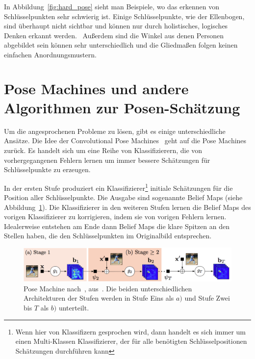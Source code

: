 \documentclass[journal, a4paper]{IEEEtran}
\begin{document}
        In Abbildung~\ref{fig:hard_pose} sieht man Beispiele, wo das erkennen von Schlüsselpunkten sehr schwierig ist. Einige Schlüsselpunkte, wie der Ellenbogen, sind überhaupt nicht sichtbar und können nur durch holistisches, logisches Denken erkannt werden.~\cite{toshev2014deeppose} Außerdem sind die Winkel aus denen Personen abgebildet sein können sehr unterschiedlich und die Gliedmaßen folgen keinen einfachen Anordnungsmustern.


\section{Pose Machines und andere Algorithmen zur Posen-Schätzung}
        Um die angesprochenen Probleme zu lösen, gibt es einige unterschiedliche Ansätze. %
        Die Idee der Convolutional Pose Machines~\cite{conv_pose} geht auf die Pose Machines~\cite{ramakrishna2014pose} zurück. Es handelt sich um eine Reihe von Klassifizierern, die von vorhergegangenen Fehlern lernen um immer bessere Schätzungen für Schlüsselpunkte zu erzeugen. 

        In der ersten Stufe produziert ein Klassifizierer\footnote{Wenn hier von Klassifizern gesprochen wird, dann handelt es sich immer um einen Multi-Klassen Klassifizierer, der für alle benötigten Schlüsselpositionen Schätzungen durchführen kann} initiale Schätzungen für die Position aller Schlüsselpunkte. Die Ausgabe sind sogenannte Belief Maps (siehe Abbildung~\ref{fig:pose_machine}). Die Klassifizierer in den weiteren Stufen lernen die Belief Maps des vorigen Klassifizierer zu korrigieren, indem sie von vorigen Fehlern lernen. Idealerweise entstehen am Ende dann Belief Maps die klare Spitzen an den Stellen haben, die den Schlüsselpunkten im Originalbild entsprechen.

        \begin{figure}[!hbt]
                \begin{center}
                \includegraphics[width=1\columnwidth]{pose_machine.png}
                \caption{Pose Machine nach~\cite{ramakrishna2014pose}, aus~\cite{conv_pose}. Die beiden unterschiedlichen Architekturen der Stufen werden in Stufe Eins als $a)$ und Stufe Zwei bis $T$ als $b)$ unterteilt.}
                \label{fig:pose_machine}
                
                \end{center}
        \end{figure}
\end{document}

